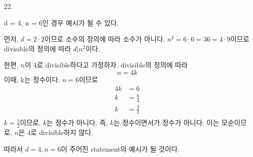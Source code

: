 \documentclass{article}
\begin{document}
22.
\begin{addmargin}[1em]{2em}
d = 4, n = 6인 경우 예시가 될 수 있다.
\newline

먼저, $d = 2\cdot 2$이므로 소수의 정의에 따라 소수가 아니다. 
$n^2=6\cdot 6 = 36 = 4 \cdot 9$이므로 divisible의 정의에 따라 $d|n^2$이다.
\newline

한편, $n$이 4로 divisible하다고 가정하자. divisible의 정의에 따라
\[n=4k\]
이때, k는 정수이다. $n=6$이므로
\begin{align*}
    4k &= 6 \\
    k &= \frac{6}{4} \\
    k &= \frac{3}{2} \\
\end{align*}
$k = \frac{3}{2}$이므로, $k$는 정수가 아니다. 즉, $k$는 정수이면서가 정수가 아니다. 이는 모순이므로, $n$은 4로 divisible하지 않다.
\newline

따라서 $d=4, n=6$이 주어진 statement의 예시가 될 것이다.
\end{addmargin}
\bigskip
\end{document}
